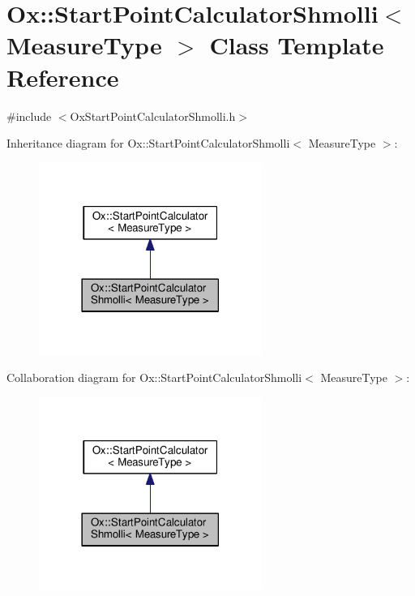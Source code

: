 \hypertarget{class_ox_1_1_start_point_calculator_shmolli}{}\section{Ox\+:\+:Start\+Point\+Calculator\+Shmolli$<$ Measure\+Type $>$ Class Template Reference}
\label{class_ox_1_1_start_point_calculator_shmolli}


{\ttfamily \#include $<$Ox\+Start\+Point\+Calculator\+Shmolli.\+h$>$}



Inheritance diagram for Ox\+:\+:Start\+Point\+Calculator\+Shmolli$<$ Measure\+Type $>$\+:
\nopagebreak
\begin{figure}[H]
\begin{center}
\leavevmode
\includegraphics[width=206pt]{class_ox_1_1_start_point_calculator_shmolli__inherit__graph}
\end{center}
\end{figure}


Collaboration diagram for Ox\+:\+:Start\+Point\+Calculator\+Shmolli$<$ Measure\+Type $>$\+:
\nopagebreak
\begin{figure}[H]
\begin{center}
\leavevmode
\includegraphics[width=206pt]{class_ox_1_1_start_point_calculator_shmolli__coll__graph}
\end{center}
\end{figure}

